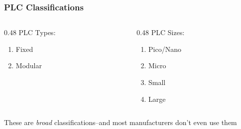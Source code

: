 \begin{frame}
    \frametitle{PLC Classifications}

    \begin{columns}[t]
        \begin{column}{0.48\linewidth}
            PLC Types:
            \begin{enumerate}
                \item Fixed
                \item Modular
            \end{enumerate}
        \end{column}
        \begin{column}{0.48\linewidth}
            PLC Sizes:
            \begin{enumerate}
                \item Pico/Nano
                \item Micro
                \item Small
                \item Large
            \end{enumerate}
        \end{column}
    \end{columns}

    \vspace{0.25in}
    \centering
    {These are \emph{broad} classifications--and most manufacturers don't even use them}
\end{frame}

